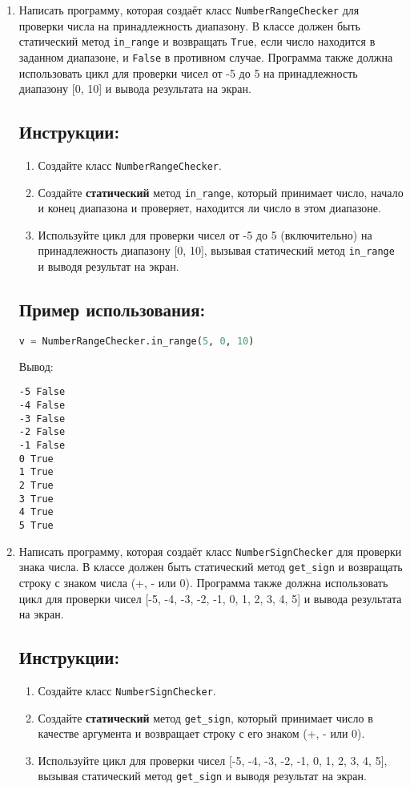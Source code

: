 \begin{enumerate}
\item
Написать программу, которая создаёт класс \texttt{NumberRangeChecker} 
для проверки числа на принадлежность диапазону. В классе должен быть статический метод
\texttt{in\_range} и возвращать \texttt{True}, если число находится в заданном диапазоне, 
и \texttt{False} в противном случае. 
Программа также должна использовать цикл для проверки чисел от 
-5 до 5 на принадлежность диапазону [0, 10] и вывода результата на экран.

\subsection*{Инструкции:}
\begin{enumerate}
    \item Создайте класс \texttt{NumberRangeChecker}.
    \item Создайте \textbf{статический} метод \texttt{in\_range}, который принимает число, начало и конец диапазона и проверяет, находится ли число в этом диапазоне.
    \item Используйте цикл для проверки чисел от -5 до 5 (включительно) на принадлежность диапазону [0, 10], вызывая статический метод \texttt{in\_range} и выводя результат на экран.
\end{enumerate}

\subsection*{Пример использования:}
\begin{lstlisting}[language=Python]
    v = NumberRangeChecker.in_range(5, 0, 10)
\end{lstlisting}
Вывод:
\begin{verbatim}
-5 False
-4 False
-3 False
-2 False
-1 False
0 True
1 True
2 True
3 True
4 True
5 True
\end{verbatim}

\item
Написать программу, которая создаёт класс \texttt{NumberSignChecker} 
для проверки знака числа. В классе должен быть статический метод
\texttt{get\_sign} и возвращать строку с знаком числа (+, - или 0). 
Программа также должна использовать цикл для проверки чисел 
[-5, -4, -3, -2, -1, 0, 1, 2, 3, 4, 5] и вывода результата на экран.

\subsection*{Инструкции:}
\begin{enumerate}
    \item Создайте класс \texttt{NumberSignChecker}.
    \item Создайте \textbf{статический} метод \texttt{get\_sign}, который принимает число в качестве аргумента и возвращает строку с его знаком (+, - или 0).
    \item Используйте цикл для проверки чисел [-5, -4, -3, -2, -1, 0, 1, 2, 3, 4, 5], вызывая статический метод \texttt{get\_sign} и выводя результат на экран.
\end{enumerate}


\end{enumerate}
